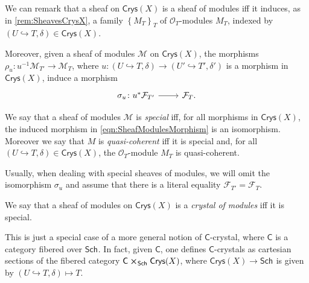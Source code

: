 \begin{rem}[]
	We can remark that a sheaf on $\mathsf{Crys}(X)$ is a sheaf of modules
	iff it induces, as in \cref{rem:SheavesCrysX}, a
	family $\left\{ M_T \right\}_{T}$ of $\mathcal{O}_{ T }$-modules $M_T$, 
	indexed by $\left(U \hookrightarrow T, \delta\right) \in \mathsf{Crys}(X)$.

	Moreover, given a sheaf of modules $\mathcal{M}$ on $\mathsf{Crys}(X)$,
	the morphisms $\rho_u\colon u^{-1}\mathcal{M}_{T'} \to \mathcal{M}_T$,
	where $u\colon \left(U \hookrightarrow T, \delta\right) \to
	\left(U' \hookrightarrow T', \delta'\right)$
	is a morphism in $\mathsf{Crys}(X)$, induce a morphism
	\begin{equation}\label{eqn:SheafModulesMorphism}
	\begin{tikzcd}[row sep = 0ex
		,/tikz/column 1/.append style={anchor=base east}
		,/tikz/column 2/.append style={anchor=base west}]
		\sigma_u\colon 
		u^* \mathcal{F}_{T'}\arrow[r, "", rightarrow] &
		\mathcal{F}_T
	.\end{tikzcd}
	\end{equation} 	
\end{rem}


\begin{defn}[]\label{defn:SpecialQCSheavesCrys}
	We say that a sheaf of modules $\mathcal{M}$ is {\em special}
	iff, for all morphisms in $\mathsf{Crys}(X)$,
	the induced morphism in \cref{eqn:SheafModulesMorphism}
	is an isomorphism.
	Moreover we say that $M$ is {\em quasi-coherent} iff it is special and, for all
	$\left(U \hookrightarrow T, \delta\right) \in \mathsf{Crys}(X)$, the $\mathcal{O}_{ T }$-module
	$M_T$ is quasi-coherent.
\end{defn}


\begin{rem}[]\label{rem:specialSheavesIso}
	Usually, when dealing with special sheaves of modules, we will omit the isomorphism
	$\sigma_u$ and assume that there is a literal equality
	$\mathcal{F}_{T'} = \mathcal{F}_T$.
\end{rem}


\begin{defn}
	We say that a sheaf of modules on $\mathsf{Crys}(X)$ is 
	a {\em crystal of modules} iff it is special.
\end{defn}


\begin{rem}[]
	This is just a special case of a more general notion 
	of $\mathsf{C}$-crystal, where $\mathsf{C}$ is a category fibered over $\mathsf{Sch}_{  }$.
	In fact, given $\mathsf{C}$, one defines $\mathsf{C}$-crystals as cartesian
	sections of the fibered category $\mathsf{C} \cross_{ \mathsf{Sch}_{  } } \mathsf{Crys}(X)$,
	where $\mathsf{Crys}(X) \to \mathsf{Sch}_{  }$ is given by
	$\left(U \hookrightarrow T, \delta\right) \mapsto T$.
\end{rem}


